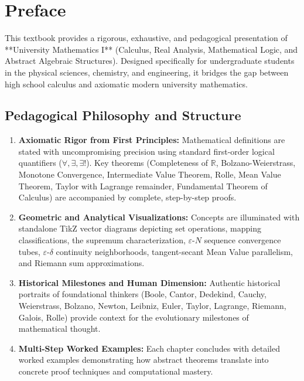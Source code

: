 \documentclass[11pt,oneside,openany]{book}
\begin{document}
\frontmatter
\pagestyle{plain}

\chapter*{Preface}

This textbook provides a rigorous, exhaustive, and pedagogical presentation of **University Mathematics I** (Calculus, Real Analysis, Mathematical Logic, and Abstract Algebraic Structures). Designed specifically for undergraduate students in the physical sciences, chemistry, and engineering, it bridges the gap between high school calculus and axiomatic modern university mathematics.

\section*{Pedagogical Philosophy and Structure}
\begin{enumerate}[leftmargin=1.8em,itemsep=5pt]
  \item \textbf{Axiomatic Rigor from First Principles:} Mathematical definitions are stated with uncompromising precision using standard first-order logical quantifiers ($\forall, \exists, \exists!$). Key theorems (Completeness of $\mathbb{R}$, Bolzano-Weierstrass, Monotone Convergence, Intermediate Value Theorem, Rolle, Mean Value Theorem, Taylor with Lagrange remainder, Fundamental Theorem of Calculus) are accompanied by complete, step-by-step proofs.
  \item \textbf{Geometric and Analytical Visualizations:} Concepts are illuminated with standalone TikZ vector diagrams depicting set operations, mapping classifications, the supremum characterization, $\varepsilon$-$N$ sequence convergence tubes, $\varepsilon$-$\delta$ continuity neighborhoods, tangent-secant Mean Value parallelism, and Riemann sum approximations.
  \item \textbf{Historical Milestones and Human Dimension:} Authentic historical portraits of foundational thinkers (Boole, Cantor, Dedekind, Cauchy, Weierstrass, Bolzano, Newton, Leibniz, Euler, Taylor, Lagrange, Riemann, Galois, Rolle) provide context for the evolutionary milestones of mathematical thought.
  \item \textbf{Multi-Step Worked Examples:} Each chapter concludes with detailed worked examples demonstrating how abstract theorems translate into concrete proof techniques and computational mastery.
\end{enumerate}

\tableofcontents

\mainmatter
\pagestyle{fancy}








\end{document}
